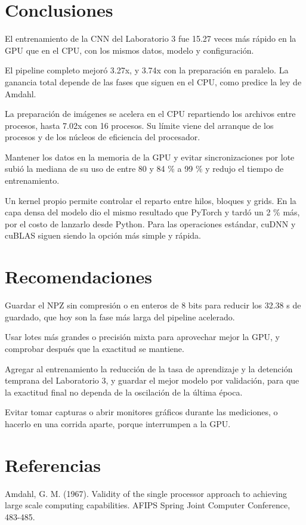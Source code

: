 \documentclass[11pt,letterpaper]{article}
\begin{document}
\section{Conclusiones}
El entrenamiento de la CNN del Laboratorio 3 fue 15.27 veces más rápido en la GPU que en el CPU, con los mismos datos, modelo y configuración.

El pipeline completo mejoró 3.27x, y 3.74x con la preparación en paralelo. La ganancia total depende de las fases que siguen en el CPU, como predice la ley de Amdahl.

La preparación de imágenes se acelera en el CPU repartiendo los archivos entre procesos, hasta 7.02x con 16 procesos. Su límite viene del arranque de los procesos y de los núcleos de eficiencia del procesador.

Mantener los datos en la memoria de la GPU y evitar sincronizaciones por lote subió la mediana de su uso de entre 80 y 84 \% a 99 \% y redujo el tiempo de entrenamiento.

Un kernel propio permite controlar el reparto entre hilos, bloques y grids. En la capa densa del modelo dio el mismo resultado que PyTorch y tardó un 2 \% más, por el costo de lanzarlo desde Python. Para las operaciones estándar, cuDNN y cuBLAS siguen siendo la opción más simple y rápida.

\section{Recomendaciones}
Guardar el NPZ sin compresión o en enteros de 8 bits para reducir los 32.38 s de guardado, que hoy son la fase más larga del pipeline acelerado.

Usar lotes más grandes o precisión mixta para aprovechar mejor la GPU, y comprobar después que la exactitud se mantiene.

Agregar al entrenamiento la reducción de la tasa de aprendizaje y la detención temprana del Laboratorio 3, y guardar el mejor modelo por validación, para que la exactitud final no dependa de la oscilación de la última época.

Evitar tomar capturas o abrir monitores gráficos durante las mediciones, o hacerlo en una corrida aparte, porque interrumpen a la GPU.

\section*{Referencias}
Amdahl, G. M. (1967). Validity of the single processor approach to achieving large scale computing capabilities. AFIPS Spring Joint Computer Conference, 483-485.
\end{document}
